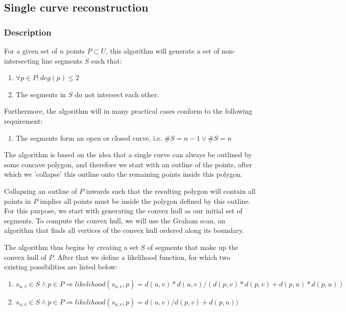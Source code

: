 \documentclass[11pt]{article}
\begin{document}
\subsection{Single curve reconstruction}
\subsubsection{Description}
For a given set of $n$ points $P \subset U$, this algorithm will generate a set of non-intersecting line segments $S$ such that:

\noindent\begin{enumerate}\topsep=0pt\itemsep=0pt\parsep=0pt
\item $\forall p \in P : deg(p) \leq 2$
\item The segments in $S$ do not intersect each other.
\end{enumerate}

Furthermore, the algorithm will in many practical cases conform to the following requirement:

\noindent\begin{enumerate}\topsep=0pt\itemsep=0pt\parsep=0pt
\item The segments form an open or closed curve, i.e. $\#S = n-1 \vee \#S = n$
\end{enumerate}

The algorithm is based on the idea that a single curve can always be outlined by some concave polygon, and therefore we start with an outline of the points, after which we 'collapse' this outline onto the remaining points inside this polygon.

Collapsing an outline of $P$ inwards such that the resulting polygon will contain all points in $P$ implies all points must be inside the polygon defined by this outline. For this purpose, we start with generating the convex hull as our initial set of segments. To compute the convex hull, we will use the Graham scan\cite{convex}, an algorithm that finds all vertices of the convex hull ordered along its boundary.

The algorithm thus begins by creating a set $S$ of segments that make up the convex hull of $P$. After that we define a likelihood function, for which two existing possibilities are listed below:

\noindent\begin{enumerate}\topsep=0pt\itemsep=0pt\parsep=0pt
\item $s_{u,v} \in S \wedge p \in P \Rightarrow likelihood(s_{u,v}, p) = d(u, v)*d(u, v)/(d(p, v)*d(p, v)+d(p, u)*d(p, u))$
\item $s_{u,v} \in S \wedge p \in P \Rightarrow likelihood(s_{u,v}, p) = d(u, v)/d(p, v)+d(p, u))$
\end{enumerate}
\end{document}
